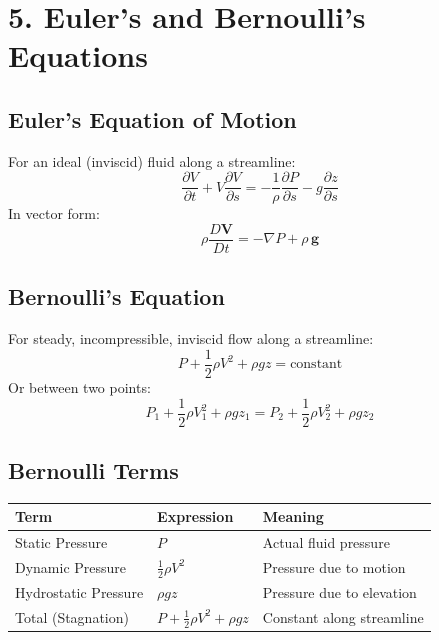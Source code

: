 \documentclass[12pt]{article}
\newcommand{\hcell}[1]{\textbf{\color{white}#1}}
\begin{document}
\section{5. Euler's and Bernoulli's Equations}

\subsection{Euler's Equation of Motion}

\begin{derivbox}
For an ideal (inviscid) fluid along a streamline:
\[
  \frac{\partial V}{\partial t} + V\frac{\partial V}{\partial s} = -\frac{1}{\rho}\frac{\partial P}{\partial s} - g\frac{\partial z}{\partial s}
\]
In vector form:
\[
  \rho\frac{D\mathbf{V}}{Dt} = -\nabla P + \rho\,\mathbf{g}
\]
\end{derivbox}

\subsection{Bernoulli's Equation}

\begin{thmbox}
For steady, incompressible, inviscid flow along a streamline:
\[
  \boxed{P + \frac{1}{2}\rho V^2 + \rho g z = \text{constant}}
\]
Or between two points:
\[
  P_1 + \frac{1}{2}\rho V_1^2 + \rho g z_1 = P_2 + \frac{1}{2}\rho V_2^2 + \rho g z_2
\]
\end{thmbox}

\subsection{Bernoulli Terms}

\begin{center}
\renewcommand{\arraystretch}{1.4}
\begin{tabular}{|C{3.5cm}|C{4cm}|C{5cm}|}
\hline
{}
\hcell{Term} & \hcell{Expression} & \hcell{Meaning} \\
\hline
Static Pressure & $P$ & Actual fluid pressure \\
Dynamic Pressure & $\frac{1}{2}\rho V^2$ & Pressure due to motion \\
Hydrostatic Pressure & $\rho g z$ & Pressure due to elevation \\
Total (Stagnation) & $P + \frac{1}{2}\rho V^2 + \rho gz$ & Constant along streamline \\
\hline
\end{tabular}
\end{center}
\end{document}
